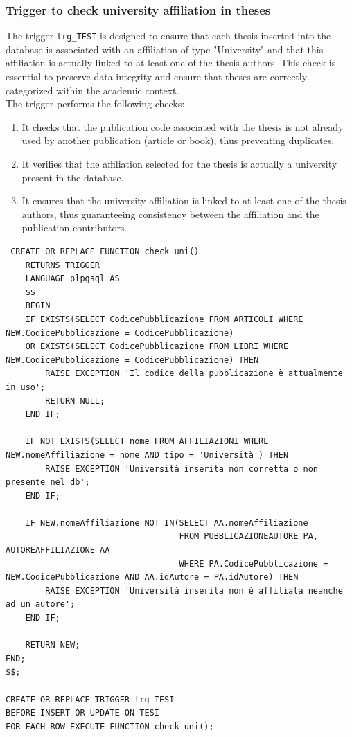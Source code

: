 \documentclass[a4paper,12pt]{article}
\begin{document}
\subsubsection{Trigger to check university affiliation in theses}
The trigger \texttt{trg\_TESI} is designed to ensure that each thesis inserted into the database is associated with an affiliation of type "University" and that this affiliation is actually linked to at least one of the thesis authors. This check is essential to preserve data integrity and ensure that theses are correctly categorized within the academic context.\\
The trigger performs the following checks:
\begin{enumerate}[label=\textbf{\arabic*}), leftmargin=1.5cm]
    \item It checks that the publication code associated with the thesis is not already used by another publication (article or book), thus preventing duplicates.
    \item It verifies that the affiliation selected for the thesis is actually a university present in the database.
    \item It ensures that the university affiliation is linked to at least one of the thesis authors, thus guaranteeing consistency between the affiliation and the publication contributors.
\end{enumerate}

\begin{lstlisting}
 CREATE OR REPLACE FUNCTION check_uni()
    RETURNS TRIGGER
    LANGUAGE plpgsql AS 
    $$
    BEGIN
    IF EXISTS(SELECT CodicePubblicazione FROM ARTICOLI WHERE NEW.CodicePubblicazione = CodicePubblicazione)
    OR EXISTS(SELECT CodicePubblicazione FROM LIBRI WHERE NEW.CodicePubblicazione = CodicePubblicazione) THEN
        RAISE EXCEPTION 'Il codice della pubblicazione è attualmente in uso';
        RETURN NULL;
    END IF;
    
    IF NOT EXISTS(SELECT nome FROM AFFILIAZIONI WHERE NEW.nomeAffiliazione = nome AND tipo = 'Università') THEN
        RAISE EXCEPTION 'Università inserita non corretta o non presente nel db';
    END IF;
    
    IF NEW.nomeAffiliazione NOT IN(SELECT AA.nomeAffiliazione
                                   FROM PUBBLICAZIONEAUTORE PA, AUTOREAFFILIAZIONE AA
                                   WHERE PA.CodicePubblicazione = NEW.CodicePubblicazione AND AA.idAutore = PA.idAutore) THEN
        RAISE EXCEPTION 'Università inserita non è affiliata neanche ad un autore';
    END IF;
        
    RETURN NEW;
END;
$$;

CREATE OR REPLACE TRIGGER trg_TESI
BEFORE INSERT OR UPDATE ON TESI
FOR EACH ROW EXECUTE FUNCTION check_uni();
\end{lstlisting}
\end{document}

